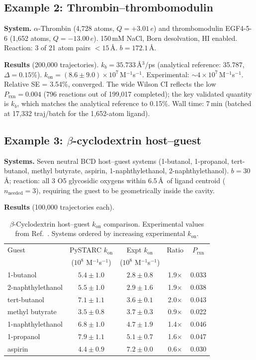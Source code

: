 \documentclass[journal=jctcce,manuscript=article,layout=twocolumn]{achemso}
\newcommand{\kon}{k_{\mathrm{on}}}
\newcommand{\Prxn}{P_{\mathrm{rxn}}}
\begin{document}
\subsection{Example 2: Thrombin--thrombomodulin}

\textbf{System.}
$\alpha$-Thrombin (4{,}728 atoms, $Q = +3.01\,e$) and
thrombomodulin EGF4-5-6 (1{,}652 atoms, $Q = -13.00\,e$).
150\,mM NaCl, Born desolvation, HI enabled.
Reaction: 3 of 21 atom pairs $< 15$\,\AA.
$b = 172.1$\,\AA.

\textbf{Results} (200{,}000 trajectories).
$k_b = 35.733$\,\AA$^3$/ps (analytical reference: 35.787,
$\Delta = 0.15\%$).
$\kon = (8.6 \pm 9.0) \times 10^{7}$\,M$^{-1}$s$^{-1}$.
Experimental: $\sim 4 \times 10^{7}$\,M$^{-1}$s$^{-1}$.~\cite{Mathews1994}
Relative SE = 3.54\%, converged.
The wide Wilson CI reflects the low $\Prxn = 0.004$ (796 reactions
out of 199{,}017 completed); the key validated quantity is $k_b$,
which matches the analytical reference to 0.15\%.
Wall time: 7\,min (batched at 17{,}332 traj/batch for the
1{,}652-atom ligand).

\subsection{Example 3: $\beta$-cyclodextrin host--guest}

\textbf{Systems.}
Seven neutral BCD host--guest systems (1-butanol, 1-propanol,
tert-butanol, methyl butyrate, aspirin, 1-naphthylethanol,
2-naphthylethanol).
$b = 30$\,\AA; reaction: all 3 O5 glycosidic oxygens
within 6.5\,\AA\ of ligand centroid ($n_\mathrm{needed} = 3$),
requiring the guest to be geometrically inside the cavity.

\textbf{Results} (100{,}000 trajectories each).

\begin{table}[h]
\caption{$\beta$-Cyclodextrin host--guest $\kon$ comparison.
Experimental values from Ref.~.
Systems ordered by increasing experimental $\kon$.}
\label{tab:bcd}
\footnotesize
\begin{tabular}{lcccc}
\toprule
Guest & PySTARC $\kon$ & Expt $\kon$ & Ratio & $\Prxn$ \\
      & ($10^8$ M$^{-1}$s$^{-1}$) & ($10^8$ M$^{-1}$s$^{-1}$) & & \\
\midrule
1-butanol         & $5.4 \pm 1.0$ & $2.8 \pm 0.8$ & 1.9$\times$ & 0.033 \\
2-naphthylethanol & $5.5 \pm 1.0$ & $2.9 \pm 1.6$ & 1.9$\times$ & 0.038 \\
tert-butanol      & $7.1 \pm 1.1$ & $3.6 \pm 0.1$ & 2.0$\times$ & 0.043 \\
methyl butyrate   & $3.5 \pm 0.8$ & $3.7 \pm 0.3$ & 0.9$\times$ & 0.022 \\
1-naphthylethanol & $6.8 \pm 1.0$ & $4.7 \pm 1.9$ & 1.4$\times$ & 0.046 \\
1-propanol        & $7.9 \pm 1.1$ & $5.1 \pm 0.7$ & 1.6$\times$ & 0.047 \\
aspirin           & $4.4 \pm 0.9$ & $7.2 \pm 0.0$ & 0.6$\times$ & 0.030 \\
\bottomrule
\end{tabular}
\end{table}
\end{document}
